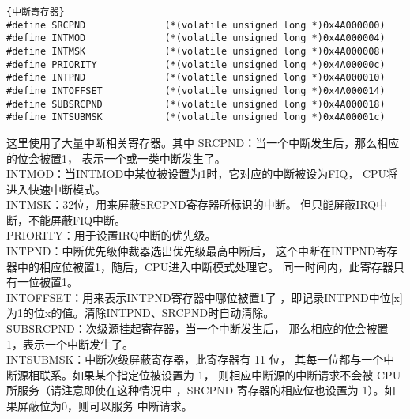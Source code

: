 \begin{lstlisting}{中断寄存器}
#define SRCPND              (*(volatile unsigned long *)0x4A000000)
#define INTMOD              (*(volatile unsigned long *)0x4A000004)
#define INTMSK              (*(volatile unsigned long *)0x4A000008)
#define PRIORITY            (*(volatile unsigned long *)0x4A00000c)
#define INTPND              (*(volatile unsigned long *)0x4A000010)
#define INTOFFSET           (*(volatile unsigned long *)0x4A000014)
#define SUBSRCPND           (*(volatile unsigned long *)0x4A000018)
#define INTSUBMSK           (*(volatile unsigned long *)0x4A00001c)
\end{lstlisting}
这里使用了大量中断相关寄存器。其中
SRCPND：当一个中断发生后，那么相应的位会被置1，
表示一个或一类中断发生了。\\
INTMOD：当INTMOD中某位被设置为1时，它对应的中断被设为FIQ，
CPU将进入快速中断模式。\\
INTMSK：32位，用来屏蔽SRCPND寄存器所标识的中断。
但只能屏蔽IRQ中断，不能屏蔽FIQ中断。\\
PRIORITY：用于设置IRQ中断的优先级。\\
INTPND：中断优先级仲裁器选出优先级最高中断后，
这个中断在INTPND寄存器中的相应位被置1，随后，CPU进入中断模式处理它。
同一时间内，此寄存器只有一位被置1。\\
INTOFFSET：用来表示INTPND寄存器中哪位被置1了
，即记录INTPND中位[x]为1的位x的值。清除INTPND、SRCPND时自动清除。\\
SUBSRCPND：次级源挂起寄存器，当一个中断发生后，
那么相应的位会被置1，表示一个中断发生了。\\
INTSUBMSK：中断次级屏蔽寄存器，此寄存器有 11 位，
其每一位都与一个中断源相联系。如果某个指定位被设置为 1，
则相应中断源的中断请求不会被 CPU 所服务（请注意即使在这种情况中
，SRCPND 寄存器的相应位也设置为 1）。如果屏蔽位为0，则可以服务
中断请求。\\
